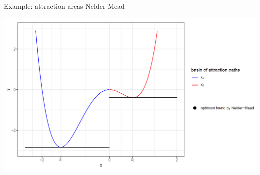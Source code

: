 \documentclass[11pt,compress,t,notes=noshow, xcolor=table]{beamer}
\begin{document}
\begin{vbframe}{Example: attraction areas Nelder-Mead}

\begin{center}
\includegraphics[width=1\textwidth]{figure_man/example-nelder.png}
\end{center}




\end{vbframe}
\end{document}
